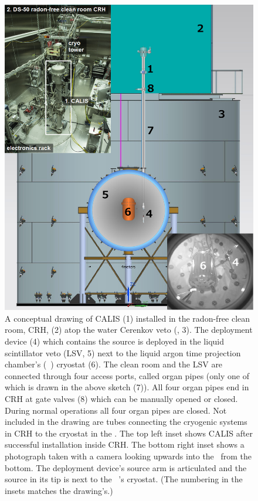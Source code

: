 \begin{figure}[htbp]
 \centering
\includegraphics[width=\textwidth]{Figures/DS50_with_CALIS_twoinsets}
\caption{A conceptual drawing of CALIS (1) installed in the radon-free clean room, CRH, (2) atop the water Cerenkov veto (\wcv, 3). The deployment device (4) which contains the source is deployed in the liquid scintillator veto (LSV, 5) next to the liquid argon time projection chamber's (\lar\ \tpc) cryostat (6). The clean room and the LSV are connected through four access ports, called organ pipes (only one of which is drawn in the above sketch (7)). All four organ pipes end in CRH at gate valves (8) which can be manually opened or closed. During normal operations all four organ pipes are closed. Not included in the drawing are tubes connecting the cryogenic systems in CRH to the cryostat in the \lsv. The top left inset shows CALIS after successful installation inside CRH. The bottom right inset shows a photograph taken with a camera looking upwards into the \lsv\ from the bottom. The deployment device's source arm is articulated and the source in its tip is next to the \lar\ \tpc's cryostat. (The numbering in the insets matches the drawing's.) \label{fig:wholeAssembly_insideDetectors}\label{fig:DS50_with_CALIS}}
\end{figure}